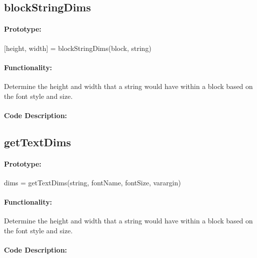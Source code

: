 \documentclass[12pt,letterpaper]{report}
\begin{document}
\subsection{blockStringDims}
\paragraph{Prototype:} [height, width] = blockStringDims(block, string)
\paragraph{Functionality:} Determine the height and width that a string would have within a block based on the font style and size.
\paragraph{Code Description:}

\subsection{getTextDims}
\paragraph{Prototype:} dims = getTextDims(string, fontName, fontSize, varargin)
\paragraph{Functionality:} Determine the height and width that a string would have within a block based on the font style and size.
\paragraph{Code Description:}

\end{document}
